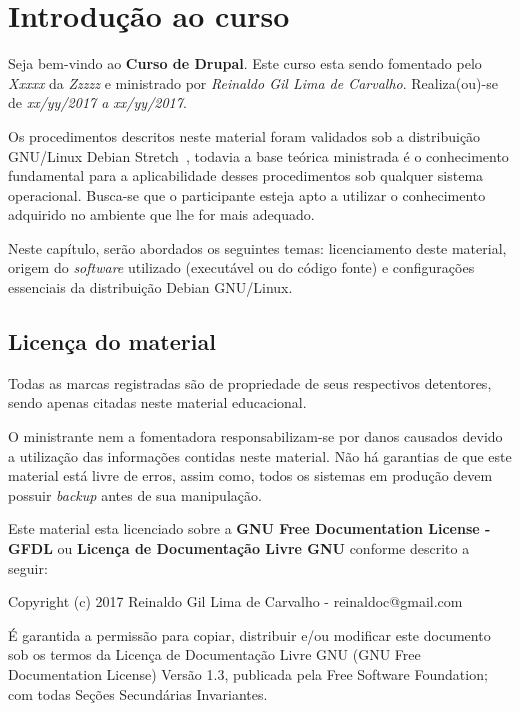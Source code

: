 \newpage \chapter{Introdução ao curso}\setcounter{SteP}{1}

    Seja bem-vindo ao {\bf Curso de Drupal}. Este curso esta sendo
fomentado pelo {\it Xxxxx}
da {\it Zzzzz} e ministrado por {\it Reinaldo Gil Lima
de Carvalho}. Realiza(ou)-se de {\it xx/yy/2017 a xx/yy/2017}.

    Os procedimentos descritos neste material foram validados sob a
distribuição GNU/Linux Debian Stretch~\cite{Debian}, todavia a base teórica ministrada é o
conhecimento fundamental para a aplicabilidade desses procedimentos sob
qualquer sistema operacional. Busca-se que o participante esteja apto a
utilizar o conhecimento adquirido no ambiente que lhe for mais adequado.

    Neste capítulo, serão abordados os seguintes temas: licenciamento deste
material, origem do {\it software} utilizado (executável ou do código fonte)
e configurações essenciais da distribuição Debian GNU/Linux.

\section{Licença do material}\setcounter{SteP}{1}

    Todas as marcas registradas são de propriedade de seus respectivos
detentores, sendo apenas citadas neste material educacional.

    O ministrante nem a fomentadora responsabilizam-se por danos causados
devido a utilização das informações contidas neste material. Não há
garantias de que este material está livre de erros, assim como, todos os
sistemas em produção devem possuir {\it backup} antes de sua manipulação.

    Este material esta licenciado sobre a {\bf GNU Free Documentation
License - GFDL} ou {\bf Licença de Documentação Livre GNU} conforme descrito a
seguir:

\begin{BoxVerbatim}
    Copyright (c) 2017 Reinaldo Gil Lima de Carvalho - reinaldoc@gmail.com

    É garantida a permissão para copiar, distribuir e/ou modificar este documento
sob os termos da Licença de Documentação Livre GNU (GNU Free Documentation
License) Versão 1.3, publicada pela Free Software Foundation; com todas Seções
Secundárias Invariantes.
\end{BoxVerbatim}

